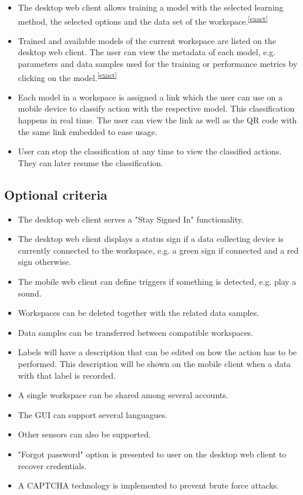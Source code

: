 \begin{itemize}
    \item The desktop web client allows training a model with the selected learning method, the selected options and the data set of the workspace.\textsuperscript{\ref{exact}}
    \item Trained and available models of the current workspace are listed on the desktop web client. The user can view the metadata of each model, e.g. parameters and data samples used for the training or performance metrics by clicking on the model.\textsuperscript{\ref{exact}}
    \item Each model in a workspace is assigned a link which the user can use on a mobile device to classify action with the respective model. This classification happens in real time. The user can view the link as well as the QR code with the same link embedded to ease usage. 
    \item User can stop the classification at any time to view the classified actions. They can later resume the classification.   
\end{itemize}

\subsection{Optional criteria}
\begin{itemize}
    \item The desktop web client serves a "Stay Signed In" functionality.
    \item The desktop web client displays a status sign if a data collecting device is currently connected to the workspace, e.g. a green sign if connected and a red sign otherwise.
    \item The mobile web client can define triggers if something is detected, e.g. play a sound.
    \item Workspaces can be deleted together with the related data samples.
    \item Data samples can be transferred between compatible workspaces.
    \item Labels will have a description that can be edited on how the action has to be performed. This description will be shown on the mobile client when a data with that label is recorded.
    \item A single workspace can be shared among several accounts.
    \item The GUI can support several languagues.
    \item Other sensors can also be supported.
    \item "Forgot password" option is presented to user on the desktop web client to recover credentials.
    \item A CAPTCHA technology is implemented to prevent brute force attacks.
\end{itemize}

